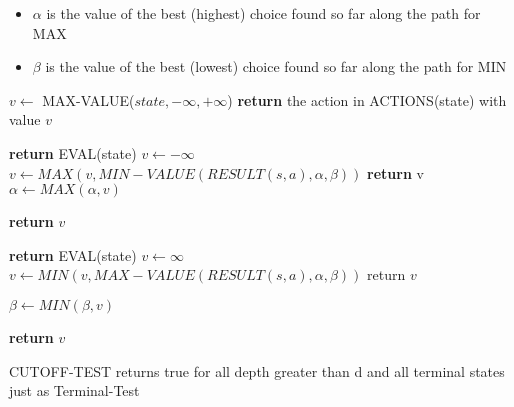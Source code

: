 \documentclass{article}
\begin{document}
\begin{itemize}
    \item $\alpha$ is the value of the best (highest) choice found so far along the path for MAX
    \item $\beta$ is the value of the best (lowest) choice found so far along the path for MIN
\end{itemize}

\begin{algorithm}
\begin{algorithmic}

    \State $v \leftarrow$ MAX-VALUE($state,-\infty , +\infty$)
    \State \textbf{return} the action in ACTIONS(state) with value $v$
\EndProcedure \newline

        \State \textbf{return} EVAL(state)
    \EndIf
    \State $v \leftarrow -\infty$
        $v \leftarrow MAX(v,MIN-VALUE(RESULT(s,a),\alpha,\beta))$
        \textbf{return} v
        \EndIf
        \State $\alpha \leftarrow MAX(\alpha,v)$
    \EndFor

    \State \textbf{return} $v$ 
\EndProcedure \newline

        \State \textbf{return} EVAL(state)
        \State $v \leftarrow \infty$
    \EndIf
    \State $v \leftarrow MIN(v,MAX-VALUE(RESULT(s,a),\alpha,\beta))$
        \State return $v$
       
    \EndIf
    \State $\beta \leftarrow MIN(\beta, v)$
    \EndFor
    
    \State \textbf{return} $v$

\EndProcedure

\end{algorithmic}
\end{algorithm}


CUTOFF-TEST returns true for all depth greater than d and all terminal states just as Terminal-Test
\end{document}
